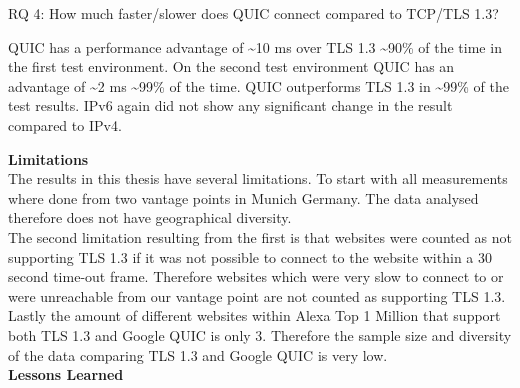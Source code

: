 \begin{QandA}
\begin{answered}
   		\end{answered}
   \item [RQ 4:] How much faster/slower does QUIC connect compared to TCP/TLS 1.3?
        \begin{answered}
        QUIC has a performance advantage of \textasciitilde 10 ms over TLS 1.3 \textasciitilde 90\% of the time in the first test environment.
        On the second test environment QUIC has an advantage of \textasciitilde 2 ms  \textasciitilde 99\% of the time.
        QUIC outperforms TLS 1.3 in \textasciitilde 99\% of the test results.
        IPv6 again did not show any significant change in the result compared to IPv4.
   		\end{answered}
\end{QandA}

\noindent\textbf{Limitations}\\
The results in this thesis have several limitations. To start with all measurements where done from two vantage points in Munich Germany. The data analysed therefore does not have geographical diversity.\\
The second limitation resulting from the first is that websites were counted as not supporting TLS 1.3 if it was not possible to connect to the website within a 30 second time-out frame.
Therefore websites which were very slow to connect to or were unreachable from our vantage point are not counted as supporting TLS 1.3.
Lastly the amount of different websites within Alexa Top 1 Million that support both TLS 1.3 and Google QUIC is only 3.
Therefore the sample size and diversity of the data comparing TLS 1.3 and Google QUIC  is very low.\\

\noindent\textbf{Lessons Learned}\\
\label{chapter:lessons_learned}

